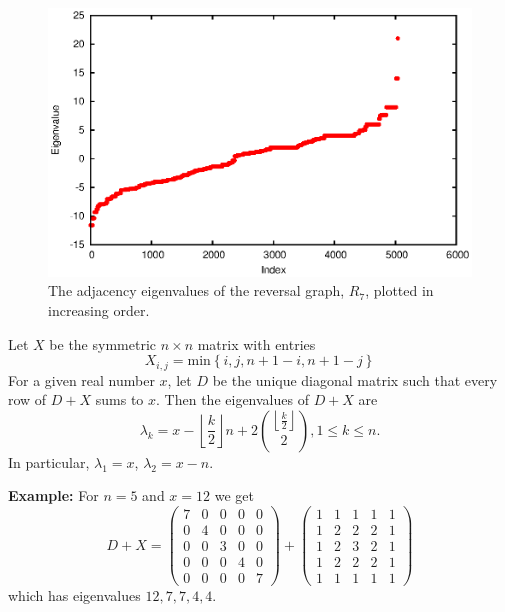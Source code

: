 \begin{figure}[h]
\begin{center}
\includegraphics[scale=.85]{figures/all_spec7.eps} 
\end{center}
\caption{The adjacency eigenvalues of the reversal graph, $R_7$, plotted in increasing order.
  \label{fig-spec7}}
\end{figure}


\begin{lemma}\label{lem:rev_eig}
Let $X$ be the symmetric $n \times n$ matrix with entries
 \[ X_{i,j} = \text{min} \left\{ i,j,n+1-i,n+1-j \right\} \]
For a given real number $x$, let $D$ be the unique diagonal matrix such 
that every row of $D+X$ sums to $x$.  Then the eigenvalues of $D+X$ are
\[ \lambda_k =  x - \left\lfloor \frac{k}{2} \right\rfloor n + 2 \binom{\left \lfloor \frac{k}{2} \right \rfloor}{2}, 1 \leq k \leq n . \]
In particular, $\lambda_1 = x$, $\lambda_2 = x-n$.
\end{lemma}


\noindent \textbf{Example: } For $n=5$ and $x=12$ we get
\[ D+X = \begin{pmatrix}
 7 & 0 & 0 & 0 & 0 \\
 0 & 4 & 0 & 0 & 0 \\
 0 & 0 & 3 & 0 & 0 \\
 0 & 0 & 0 & 4 & 0 \\
 0 & 0 & 0 & 0 & 7 
\end{pmatrix}
+ \begin{pmatrix}
 1 & 1 & 1 & 1 & 1 \\
 1 & 2 & 2 & 2 & 1 \\
 1 & 2 & 3 & 2 & 1 \\
 1 & 2 & 2 & 2 & 1 \\
 1 & 1 & 1 & 1 & 1 
\end{pmatrix} \]
which has eigenvalues $12, 7, 7, 4, 4$.


